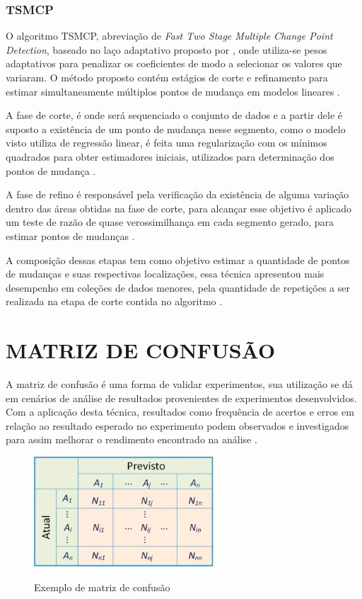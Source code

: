 \subsubsection{TSMCP}

O algoritmo TSMCP, abreviação de \textit{Fast Two Stage Multiple Change Point Detection}, baseado no laço adaptativo proposto por \cite{Zou2006}, onde utiliza-se pesos adaptativos para penalizar os coeficientes de modo a selecionar os valores que variaram. O método proposto contém estágios de corte e refinamento para estimar simultaneamente múltiplos pontos de mudança em modelos lineares \cite{Jin2016}.

A fase de corte, é onde será sequenciado o conjunto de dados e a partir dele é suposto a existência de um ponto de mudança nesse segmento, como o modelo visto utiliza de regressão linear, é feita uma regularização com os mínimos quadrados para obter estimadores iniciais, utilizados para determinação dos pontos de mudança \cite{Jin2016}.

A fase de refino é responsável pela verificação da existência de alguma variação dentro das áreas obtidas na fase de corte, para alcançar esse objetivo é aplicado um teste de razão de quase verossimilhança em cada segmento gerado, para estimar pontos de mudanças \cite{Jin2016}.

A composição dessas etapas tem como objetivo estimar a quantidade de pontos de mudanças e suas respectivas localizações, essa técnica apresentou mais desempenho em coleções de dados menores, pela quantidade de repetições a ser realizada na etapa de corte contida no algoritmo \cite{Jin2016}.

\section{MATRIZ DE CONFUSÃO}
\label{sec:matrizDeConfusao}

A matriz de confusão é uma forma de validar experimentos, sua utilização se dá em cenários de análise de resultados provenientes de experimentos desenvolvidos. Com a aplicação desta técnica, resultados como frequência de acertos e erros em relação ao resultado esperado no experimento podem observados e investigados para assim melhorar o rendimento encontrado na análise \cite{Ruuska2018}.

\begin{figure}[!htb]
    \centering
    \caption{Exemplo de matriz de confusão}
    \includegraphics[width=0.6\textwidth]{./dados/figuras/matriz-de-confusao}
    \label{fig:matriz-confusao}
\end{figure}

